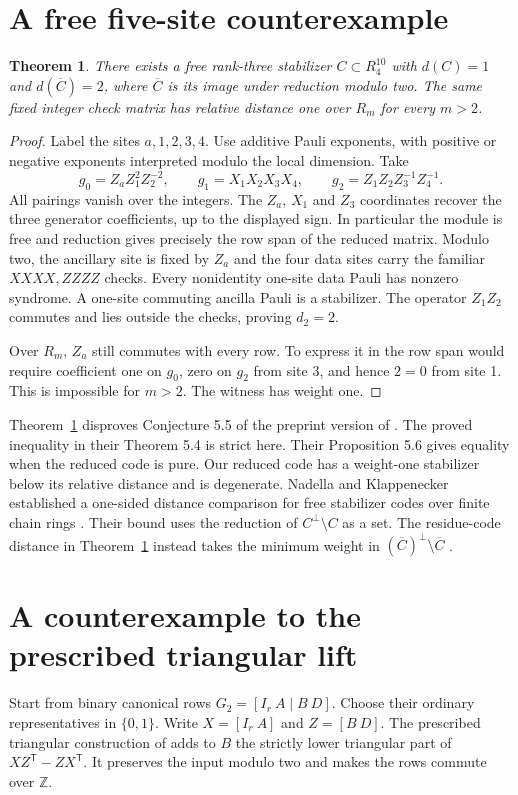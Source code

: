 \documentclass[11pt]{article}
\newtheorem{theorem}{Theorem}
\newcommand{\Z}{\mathbb Z}
\begin{document}
\section{A free five-site counterexample}
\begin{theorem}\label{thm:five}
There exists a free rank-three stabilizer $C\subset R_4^{10}$ with $d(C)=1$ and $d(\overline C)=2$, where $\overline C$ is its image under reduction modulo two. The same fixed integer check matrix has relative distance one over $R_m$ for every $m>2$.
\end{theorem}
\begin{proof}
Label the sites $a,1,2,3,4$. Use additive Pauli exponents, with positive or negative exponents interpreted modulo the local dimension. Take
\[
 g_0=Z_a Z_1^2 Z_2^{-2},\qquad
 g_1=X_1 X_2 X_3 X_4,\qquad
 g_2=Z_1 Z_2 Z_3^{-1} Z_4^{-1}.
\]
All pairings vanish over the integers. The $Z_a$, $X_1$ and $Z_3$ coordinates recover the three generator coefficients, up to the displayed sign. In particular the module is free and reduction gives precisely the row span of the reduced matrix. Modulo two, the ancillary site is fixed by $Z_a$ and the four data sites carry the familiar $XXXX,ZZZZ$ checks. Every nonidentity one-site data Pauli has nonzero syndrome. A one-site commuting ancilla Pauli is a stabilizer. The operator $Z_1Z_2$ commutes and lies outside the checks, proving $d_2=2$.

Over $R_m$, $Z_a$ still commutes with every row. To express it in the row span would require coefficient one on $g_0$, zero on $g_2$ from site 3, and hence $2=0$ from site 1. This is impossible for $m>2$. The witness has weight one.
\end{proof}
Theorem~\ref{thm:five} disproves Conjecture 5.5 of the preprint version of \cite{glp}. The proved inequality in their Theorem 5.4 is strict here. Their Proposition 5.6 gives equality when the reduced code is pure. Our reduced code has a weight-one stabilizer below its relative distance and is degenerate. Nadella and Klappenecker established a one-sided distance comparison for free stabilizer codes over finite chain rings \cite[Thm.~16]{nk}. Their bound uses the reduction of $C^\perp\setminus C$ as a set. The residue-code distance in Theorem~\ref{thm:five} instead takes the minimum weight in $(\overline C)^\perp\setminus\overline C$ \cite[Rem.~6.4]{glp}.

\section{A counterexample to the prescribed triangular lift}
Start from binary canonical rows $G_2=[I_r\ A\mid B\ D]$. Choose their ordinary representatives in $\{0,1\}$. Write $X=[I_r\ A]$ and $Z=[B\ D]$. The prescribed triangular construction of \cite{ldi20,ldi22} adds to $B$ the strictly lower triangular part of $XZ^{\mathsf T}-ZX^{\mathsf T}$. It preserves the input modulo two and makes the rows commute over $\Z$.
\end{document}
